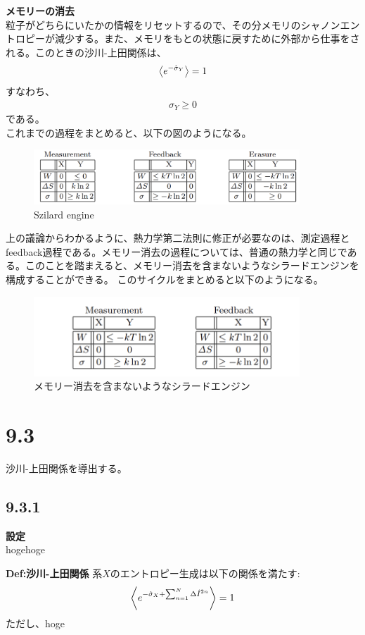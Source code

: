 \documentclass[a4paper,11pt]{jsarticle}
\numberwithin{equation}{section}
\begin{document}
\textbf{メモリーの消去}\\
粒子がどちらにいたかの情報をリセットするので、その分メモリのシャノンエントロピーが減少する。また、メモリをもとの状態に戻すために外部から仕事をされる。このときの沙川-上田関係は、
\begin{align}
    \ev{e^{-\hat{\sigma}_Y}} = 1
\end{align}
すなわち、
\begin{align}
    \sigma_Y \geq 0
\end{align}
である。\\

これまでの過程をまとめると、以下の図のようになる。\\
\begin{figure}[H]
    \begin{center}
    \includegraphics[width=100mm]{mfe.png}
    \end{center}
    \caption{Szilard engine}
    \label{fig:mfe}
\end{figure}
上の議論からわかるように、熱力学第二法則に修正が必要なのは、測定過程とfeedback過程である。メモリー消去の過程については、普通の熱力学と同じである。このことを踏まえると、メモリー消去を含まないようなシラードエンジンを構成することができる。
このサイクルをまとめると以下のようになる。\\
\begin{figure}[H]
    \begin{center}
    \includegraphics[width=100mm]{cycle.png}
    \end{center}
    \caption{メモリー消去を含まないようなシラードエンジン}
    \label{fig:cycle}
\end{figure}

\section*{9.3}
沙川-上田関係を導出する。\\
\subsection*{9.3.1}
\textbf{設定}\\
hogehoge

\begin{itembox}[l]{\textbf{Def:沙川-上田関係}}
    系$X$のエントロピー生成は以下の関係を満たす:
    \begin{align}
        \ev{e^{-\hat{\sigma}_X+\sum_{n=1}^N\Delta \hat{I}^{2n} }} = 1
    \end{align}
    ただし、hoge
\end{itembox}
\end{document}
